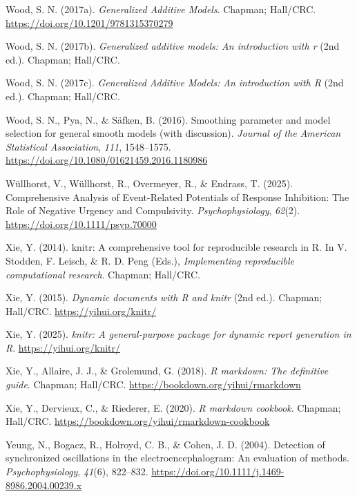 \documentclass[
  doc,
  floatsintext,
  longtable,
  a4paper,
  nolmodern,
  notxfonts,
  notimes,
  donotrepeattitle,
  colorlinks=true,linkcolor=blue,citecolor=blue,urlcolor=blue]{apa7}
\newlength{\cslhangindent}
\newenvironment{CSLReferences}[2] %
 {\begin{list}{}{%
  \setlength{\itemindent}{0pt}
  \setlength{\leftmargin}{0pt}
  \setlength{\parsep}{0pt}
  \ifodd #1
   \setlength{\leftmargin}{\cslhangindent}
   \setlength{\itemindent}{-1\cslhangindent}
  \fi
  \setlength{\itemsep}{#2\baselineskip}}}
 {\end{list}}
\begin{document}
\begin{CSLReferences}{1}{0}
Wood, S. N. (2017a). \emph{Generalized Additive Models}. Chapman;
Hall/CRC. \url{https://doi.org/10.1201/9781315370279}

Wood, S. N. (2017b). \emph{Generalized additive models: An introduction
with r} (2nd ed.). Chapman; Hall/CRC.

Wood, S. N. (2017c). \emph{Generalized {A}dditive {M}odels: An
introduction with {R}} (2nd ed.). Chapman; Hall/CRC.

Wood, S. N., Pya, N., \& Säfken, B. (2016). Smoothing parameter and
model selection for general smooth models (with discussion).
\emph{Journal of the American Statistical Association}, \emph{111},
1548--1575. \url{https://doi.org/10.1080/01621459.2016.1180986}

Wüllhorst, V., Wüllhorst, R., Overmeyer, R., \& Endrass, T. (2025).
Comprehensive Analysis of Event{-}Related Potentials of Response
Inhibition: The Role of Negative Urgency and Compulsivity.
\emph{Psychophysiology}, \emph{62}(2).
\url{https://doi.org/10.1111/psyp.70000}

Xie, Y. (2014). {knitr}: A comprehensive tool for reproducible research
in {R}. In V. Stodden, F. Leisch, \& R. D. Peng (Eds.),
\emph{Implementing reproducible computational research}. Chapman;
Hall/CRC.

Xie, Y. (2015). \emph{Dynamic documents with {R} and knitr} (2nd ed.).
Chapman; Hall/CRC. \url{https://yihui.org/knitr/}

Xie, Y. (2025). \emph{{knitr}: A general-purpose package for dynamic
report generation in {R}}. \url{https://yihui.org/knitr/}

Xie, Y., Allaire, J. J., \& Grolemund, G. (2018). \emph{R markdown: The
definitive guide}. Chapman; Hall/CRC.
\url{https://bookdown.org/yihui/rmarkdown}

Xie, Y., Dervieux, C., \& Riederer, E. (2020). \emph{R markdown
cookbook}. Chapman; Hall/CRC.
\url{https://bookdown.org/yihui/rmarkdown-cookbook}

Yeung, N., Bogacz, R., Holroyd, C. B., \& Cohen, J. D. (2004). Detection
of synchronized oscillations in the electroencephalogram: An evaluation
of methods. \emph{Psychophysiology}, \emph{41}(6), 822--832.
\url{https://doi.org/10.1111/j.1469-8986.2004.00239.x}

\end{CSLReferences}
\end{document}
